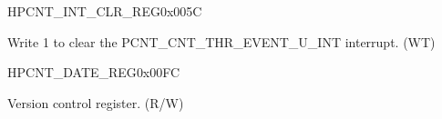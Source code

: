 \begin{register}{H}{PCNT\_INT\_CLR\_REG}{0x005C}\label{regdesc:PCNTINTCLRREG}
%
%
%
%
%
\regnewline%
\begin{regdesc}\begin{reglist}
\label{fielddesc:PCNTCNTTHREVENTUNINTCLR}\item [PCNT\_CNT\_THR\_EVENT\_U\regindex{n}\_INT\_CLR (\regindex{n}: 0-3)] Write 1 to clear the PCNT\_CNT\_THR\_EVENT\_U\_INT interrupt. (WT)
\end{reglist}\end{regdesc}
\end{register}


\begin{register}{H}{PCNT\_DATE\_REG}{0x00FC}\label{regdesc:PCNTDATEREG}
%
\regnewline%
\begin{regdesc}\begin{reglist}
\label{fielddesc:PCNTDATE}\item [PCNT\_DATE] Version control register. (R/W)
\end{reglist}\end{regdesc}
\end{register}
